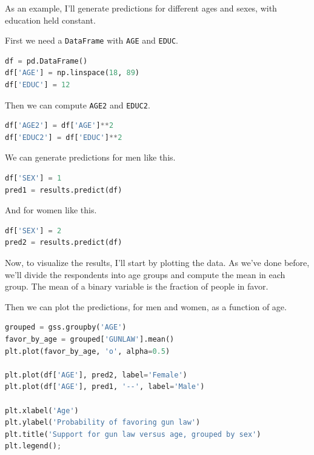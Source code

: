 As an example, I'll generate predictions for different ages and sexes,
with education held constant.

First we need a \passthrough{\lstinline!DataFrame!} with
\passthrough{\lstinline!AGE!} and \passthrough{\lstinline!EDUC!}.

\begin{lstlisting}[language=Python,style=source]
df = pd.DataFrame()
df['AGE'] = np.linspace(18, 89)
df['EDUC'] = 12
\end{lstlisting}

Then we can compute \passthrough{\lstinline!AGE2!} and
\passthrough{\lstinline!EDUC2!}.

\begin{lstlisting}[language=Python,style=source]
df['AGE2'] = df['AGE']**2
df['EDUC2'] = df['EDUC']**2
\end{lstlisting}

We can generate predictions for men like this.

\begin{lstlisting}[language=Python,style=source]
df['SEX'] = 1
pred1 = results.predict(df)
\end{lstlisting}

And for women like this.

\begin{lstlisting}[language=Python,style=source]
df['SEX'] = 2
pred2 = results.predict(df)
\end{lstlisting}

Now, to visualize the results, I'll start by plotting the data. As we've
done before, we'll divide the respondents into age groups and compute
the mean in each group. The mean of a binary variable is the fraction of
people in favor.

Then we can plot the predictions, for men and women, as a function of
age.

\begin{lstlisting}[language=Python,style=source]
grouped = gss.groupby('AGE')
favor_by_age = grouped['GUNLAW'].mean()
plt.plot(favor_by_age, 'o', alpha=0.5)

plt.plot(df['AGE'], pred2, label='Female')
plt.plot(df['AGE'], pred1, '--', label='Male')

plt.xlabel('Age')
plt.ylabel('Probability of favoring gun law')
plt.title('Support for gun law versus age, grouped by sex')
plt.legend();
\end{lstlisting}

